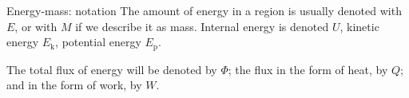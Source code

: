 \documentclass[a4paper,12pt,%
onecolumn,oneside,titlepage,%
british%
]{memoir}
\renewcommand*{\|}[1][]{\nonscript\:#1\vert\nonscript\:\mathopen{}}
\newcommand*{\sect}{\S}%
\newcommand*{\yM}{M}%
\newcommand*{\yE}{E}
\newcommand*{\yU}{U}
\newcommand*{\yEk}{\yE_{\textrm{k}}}%
\newcommand*{\yEp}{\yE_{\textrm{p}}}%
\newcommand*{\yH}{\varPhi}%
\newcommand*{\yQ}{Q}%
\newcommand*{\yW}{W}%
\newcommand*{\energym}{energy-mass}
\newcommand*{\masse}{mass-energy}
\begin{document}


% 
% 

\smallskip

\begin{definition}{Energy-mass: notation}
  The amount of energy in a region is usually denoted with $\yE$, or with $\yM$ if we describe it as mass. Internal energy is denoted $\yU$, kinetic energy $\yEk$, potential energy $\yEp$.

  \smallskip
  
  The total flux of energy will be denoted by $\yH$; the flux in the form of heat, by $\yQ$; and in the form of work, by $\yW$.
\end{definition}
\end{document}
